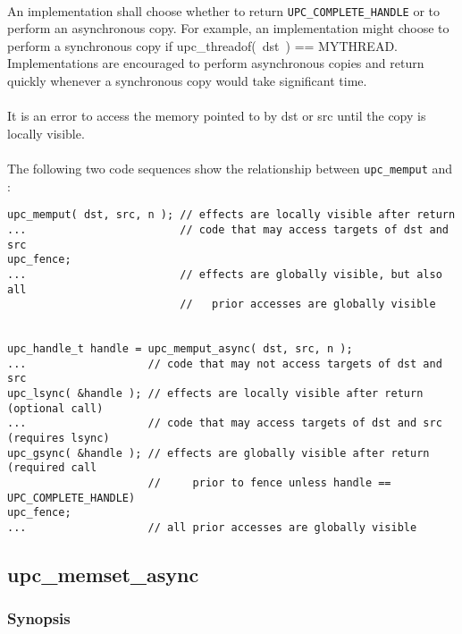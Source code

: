 \documentclass[10pt]{article}
\def \memput  {{\tt upc\_memput}}
\def \complete {{\tt UPC\_COMPLETE\_HANDLE}}
\begin{document}
\paragraph{} An implementation shall choose whether to return \complete{} or to
perform an asynchronous copy.  For example, an implementation might choose to
perform a synchronous copy if upc\_threadof(~dst~) == MYTHREAD.  Implementations
are encouraged to perform asynchronous copies and return quickly whenever a
synchronous copy would take significant time.

\paragraph{} It is an error to access the memory pointed to by dst or src until
the copy is locally visible.

\paragraph{} The following two code sequences show the relationship between
\memput{} and \function{}:

\begin{verbatim}
upc_memput( dst, src, n ); // effects are locally visible after return
...                        // code that may access targets of dst and src
upc_fence;                 
...                        // effects are globally visible, but also all
                           //   prior accesses are globally visible


upc_handle_t handle = upc_memput_async( dst, src, n );
...                   // code that may not access targets of dst and src
upc_lsync( &handle ); // effects are locally visible after return (optional call)
...                   // code that may access targets of dst and src (requires lsync)
upc_gsync( &handle ); // effects are globally visible after return (required call
                      //     prior to fence unless handle == UPC_COMPLETE_HANDLE)
upc_fence;
...                   // all prior accesses are globally visible
\end{verbatim}

\newpage
\subsection{upc\_memset\_async}
\def\function{{\tt upc\_memset\_async}}

\subsubsection{Synopsis}
\end{document}
